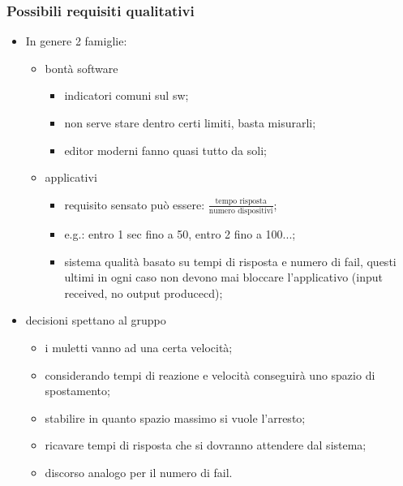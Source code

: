     \subsubsection{Possibili requisiti qualitativi}
        \begin{itemize}
            \item In genere 2 famiglie:
                \begin{itemize}
                    \item bontà software
                        \begin{itemize}
                            \item indicatori comuni sul sw;
                            \item non serve stare dentro certi limiti, basta misurarli;
                            \item editor moderni fanno quasi tutto da soli;
                        \end{itemize}
                    \item applicativi
                        \begin{itemize}
                            \item requisito sensato può essere: $\frac{\text{tempo risposta}}{\text{numero dispositivi}}$;
                            \item e.g.: entro 1 sec fino a 50, entro 2 fino a 100...;
                            \item sistema qualità basato su tempi di risposta e numero di fail, questi ultimi in ogni caso non devono mai bloccare l'applicativo (input received, no output producecd);
                        \end{itemize}
                \end{itemize}
            \item decisioni spettano al gruppo
                \begin{itemize}
                    \item i muletti vanno ad una certa velocità;
                    \item considerando tempi di reazione e velocità conseguirà uno spazio di spostamento;
                    \item stabilire in quanto spazio massimo si vuole l'arresto;
                    \item ricavare tempi di risposta che si dovranno attendere dal sistema;
                    \item discorso analogo per il numero di fail.
                \end{itemize}
        \end{itemize}

